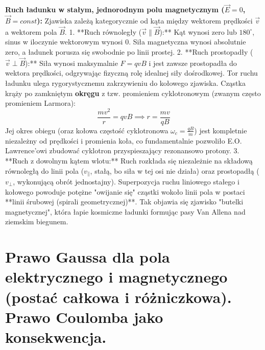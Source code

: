 \documentclass[11pt, a4paper]{article}
\begin{document}
\textbf{Ruch ładunku w stałym, jednorodnym polu magnetycznym ($\vec{E} = 0$, $\vec{B} = const$):}
Zjawiska zależą kategorycznie od kąta między wektorem prędkości $\vec{v}$ a wektorem pola $\vec{B}$.
1. **Ruch równoległy ($\vec{v} \parallel \vec{B}$):** Kąt wynosi zero lub $180^\circ$, sinus w iloczynie wektorowym wynosi $0$. Siła magnetyczna wynosi absolutnie zero, a ładunek porusza się swobodnie po linii prostej.
2. **Ruch prostopadły ($\vec{v} \perp \vec{B}$):** Siła wynosi maksymalnie $F = qvB$ i jest zawsze prostopadła do wektora prędkości, odgrywając fizyczną rolę idealnej siły dośrodkowej. Tor ruchu ładunku ulega rygorystycznemu zakrzywieniu do kołowego zjawiska. Cząstka krąży po zamkniętym \textbf{okręgu} z tzw. promieniem cyklotronowym (zwanym często promieniem Larmora):
\[
\frac{mv^2}{r} = qvB \implies r = \frac{mv}{qB}
\]
Jej okres obiegu (oraz kołowa częstość cyklotronowa $\omega_c = \frac{qB}{m}$) jest kompletnie niezależny od prędkości i promienia koła, co fundamentalnie pozwoliło E.O. Lawrence'owi zbudować cyklotron przyspieszający rezonansowo protony.
3. **Ruch z dowolnym kątem wlotu:** Ruch rozkłada się niezależnie na składową równoległą do linii pola ($v_\parallel$, stałą, bo siła w tej osi nie działa) oraz prostopadłą ($v_\perp$, wykonującą obrót jednostajny). Superpozycja ruchu liniowego stałego i kołowego powoduje potężne "owijanie się" cząstki wokoło linii pola w postaci **linii śrubowej (spirali geometrycznej)**. Tak objawia się zjawisko "butelki magnetycznej", która łapie kosmiczne ładunki formując pasy Van Allena nad ziemskim biegunem.

\section{Prawo Gaussa dla pola elektrycznego i magnetycznego (postać całkowa i różniczkowa). Prawo Coulomba jako konsekwencja.}
\end{document}
